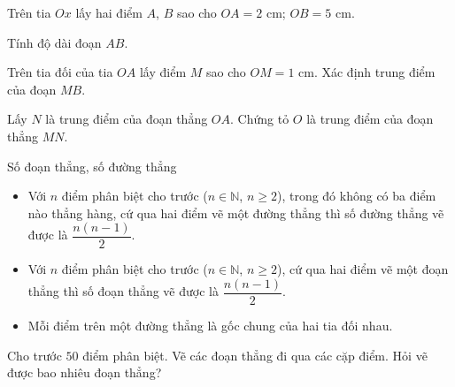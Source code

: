 \begin{vd}%
Trên tia $Ox$ lấy hai điểm $A$, $B$ sao cho $OA=2$ cm; $OB=5$ cm.
\begin{enumEX}{1}
\item Tính độ dài đoạn $AB$.
\item Trên tia đối của tia $OA$ lấy điểm $M$ sao cho $OM=1$ cm. Xác định trung điểm của đoạn $MB$.
\item Lấy $N$ là trung điểm của đoạn thẳng $OA$. Chứng tỏ $O$ là trung điểm của đoạn thẳng $MN$.
\end{enumEX}
\end{vd}

\begin{dang}{Số đoạn thẳng, số đường thẳng}
\begin{itemize}%
\item Với $n$ điểm phân biệt cho trước ($n\in\mathbb{N}$, $n\ge 2$), trong đó không có ba điểm nào thẳng hàng, cứ qua hai điểm vẽ một đường thẳng thì số đường thẳng vẽ được là $\dfrac{n(n-1)}{2}$.
\item Với $n$ điểm phân biệt cho trước ($n\in\mathbb{N}$, $n\ge 2$), cứ qua hai điểm vẽ một đoạn thẳng thì số đoạn thẳng vẽ được là $\dfrac{n(n-1)}{2}$.
\item Mỗi điểm trên một đường thẳng là gốc chung của hai tia đối nhau.
\end{itemize}
\end{dang}
\begin{vd}
Cho trước $50$ điểm phân biệt. Vẽ các đoạn thẳng đi qua các cặp điểm. Hỏi vẽ được bao nhiêu đoạn thẳng?
\end{vd}

